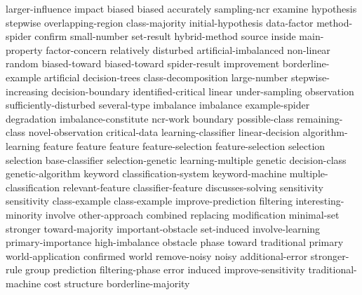 larger-influence	
impact	
biased	biased	
accurately	
sampling-ncr	
examine	
hypothesis	
stepwise	
overlapping-region	
class-majority	
initial-hypothesis	
data-factor	
method-spider	
confirm	
small-number	
set-result	
hybrid-method	
source	
inside	
main-property	
factor-concern	
relatively	
disturbed	
artificial-imbalanced	
non-linear	
random	
biased-toward	biased-toward	
spider-result	
improvement	
borderline-example	
artificial	
decision-trees	
class-decomposition	
large-number	
stepwise-increasing	
decision-boundary	
identified-critical	
linear	
under-sampling	
observation	
sufficiently-disturbed	
several-type	
imbalance	imbalance	
example-spider	
degradation	
imbalance-constitute	
ncr-work	
boundary	
possible-class	
remaining-class	
novel-observation	
critical-data	
learning-classifier	
linear-decision	
algorithm-learning	
feature	feature	feature	
feature-selection	feature-selection	
selection	selection	
base-classifier	
selection-genetic	
learning-multiple	
genetic	
decision-class	
genetic-algorithm	
keyword	
classification-system	
keyword-machine	
multiple-classification	
relevant-feature	
classifier-feature	
discusses-solving	
sensitivity	sensitivity	
class-example	class-example	
improve-prediction	
filtering	
interesting-minority	
involve	
other-approach	
combined	
replacing	
modification	
minimal-set	
stronger	
toward-majority	
important-obstacle	
set-induced	
involve-learning	
primary-importance	
high-imbalance	
obstacle	
phase	
toward	
traditional	
primary	
world-application	
confirmed	
world	
remove-noisy	
noisy	
additional-error	
stronger-rule	
group	
prediction	
filtering-phase	
error	
induced	
improve-sensitivity	
traditional-machine	
cost	
structure	
borderline-majority	
